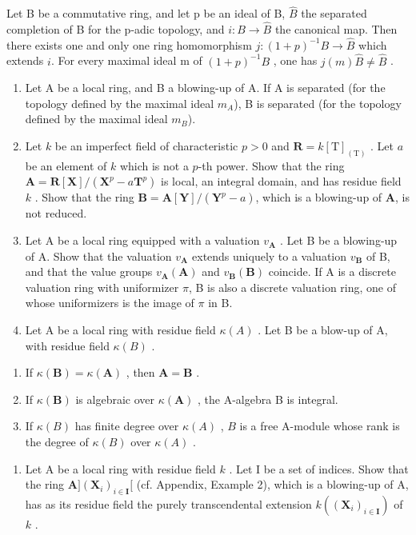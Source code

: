 Let B be a commutative ring, and let p be an ideal of B, \(\widehat{B}\) the separated completion of B for the p-adic topology, and \(i: B \to \widehat{B}\) the canonical map. Then there exists one and only one ring homomorphism \(j: (1 + p)^{-1}B \to \widehat{B}\) which extends \(i\). For every maximal ideal m of \((1 + p)^{-1}B\) , one has \(j(m)\widehat{B} \neq \widehat{B}\) .

\begin{enumerate}
\def\labelenumi{\arabic{enumi})}
\setcounter{enumi}{1}
\item
  Let A be a local ring, and B a blowing-up of A. If A is separated (for the topology defined by the maximal ideal \(m_{A}\)), B is separated (for the topology defined by the maximal ideal \(m_{B}\)).
\item
  Let \(k\) be an imperfect field of characteristic \(p > 0\) and \(\mathbf{R} = k[\mathrm{T}]_{(\mathrm{T})}\) . Let \(a\) be an element of \(k\) which is not a \(p\)-th power. Show that the ring \(\mathbf{A} = \mathbf{R}[\mathbf{X}] / (\mathbf{X}^p - a\mathbf{T}^p)\) is local, an integral domain, and has residue field \(k\) . Show that the ring \(\mathbf{B} = \mathbf{A}[\mathbf{Y}] / (\mathbf{Y}^p - a)\), which is a blowing-up of \(\mathbf{A}\), is not reduced.
\item
  Let A be a local ring equipped with a valuation \(v_{\mathbf{A}}\) . Let B be a blowing-up of A. Show that the valuation \(v_{\mathbf{A}}\) extends uniquely to a valuation \(v_{\mathbf{B}}\) of B, and that the value groups \(v_{\mathbf{A}}(\mathbf{A})\) and \(v_{\mathbf{B}}(\mathbf{B})\) coincide. If A is a discrete valuation ring with uniformizer \(\pi\), B is also a discrete valuation ring, one of whose uniformizers is the image of \(\pi\) in B.
\item
  Let A be a local ring with residue field \(\kappa(A)\) . Let B be a blow-up of A, with residue field \(\kappa(B)\) .
\end{enumerate}

\begin{enumerate}
\def\labelenumi{\alph{enumi})}
\item
  If \(\kappa(\mathbf{B}) = \kappa(\mathbf{A})\) , then \(\mathbf{A} = \mathbf{B}\) .
\item
  If \(\kappa(\mathbf{B})\) is algebraic over \(\kappa(\mathbf{A})\) , the A-algebra B is integral.
\item
  If \(\kappa(B)\) has finite degree over \(\kappa(A)\) , \(B\) is a free A-module whose rank is the degree of \(\kappa(B)\) over \(\kappa(A)\) .
\end{enumerate}

\begin{enumerate}
\def\labelenumi{\arabic{enumi})}
\setcounter{enumi}{5}
\tightlist
\item
  Let A be a local ring with residue field \(k\) . Let I be a set of indices. Show that the ring \(\mathbf{A}](\mathbf{X}_i)_{i\in \mathbf{I}}[\) (cf. Appendix, Example 2), which is a blowing-up of A, has as its residue field the purely transcendental extension \(k((\mathbf{X}_i)_{i\in \mathbf{I}})\) of \(k\) .
\end{enumerate}

